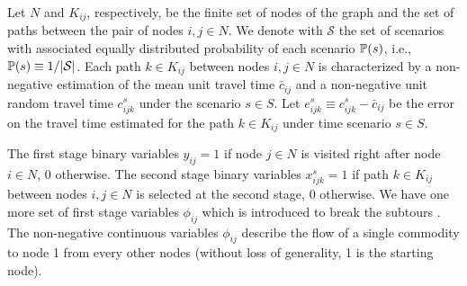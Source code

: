 Let $N$ and $K_{ij}$, respectively, be the finite set of nodes of the graph and the set of paths between the pair of nodes $i,j\in N$. We denote with $\mathcal{S}$ the set of scenarios with associated equally distributed probability of each scenario $\operatorname*{\mathbb{P}}(s)$, i.e., $\operatorname*{\mathbb{P}}(s)\equiv 1/|\mathcal{S}|$. Each path $k\in K_{ij}$ between nodes $i,j\in N$ is characterized by a non-negative estimation of the mean unit travel time $\bar{c}_{ij}$ and a non-negative unit random travel time $c_{ijk}^{s}$ under the scenario $s\in S$. Let $e_{ijk}^{s}\equiv c_{ijk}^{s}-\bar{c}_{ij}$ be the error on the travel time estimated for the path $k\in K_{ij}$ under time scenario $s\in S$.

The first stage binary variables $y_{ij}=1$ if node $j\in N$ is visited right after node $i\in N$, 0 otherwise. The second stage binary variables $x_{ijk}^{s}=1$ if path $k\in K_{ij}$ between nodes $i,j\in N$ is selected at the second stage, 0 otherwise. We have one more set of first stage variables $\phi_{ij}$ which is introduced to break the subtours \cite{journal:LSD1990}. The non-negative continuous variables $\phi_{ij}$ describe the flow of a single commodity to node 1 from every other nodes (without loss of generality, 1 is the starting node). 

